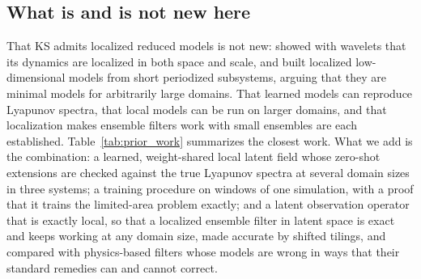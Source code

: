 \subsection{What is and is not new here}
\label{sec:bg_novelty}

That KS admits localized reduced models is not new:
\citet{wittenberg1999} showed with wavelets that its dynamics are
localized in both space and scale, and \citet{wittenberg2001} built
localized low-dimensional models from short periodized subsystems,
arguing that they are minimal models for arbitrarily large domains. That
learned models can reproduce Lyapunov spectra, that local models can be
run on larger domains, and that localization makes ensemble filters work
with small ensembles are each established. Table~\ref{tab:prior_work}
summarizes the closest work. What we add is the combination: a learned,
weight-shared local latent field whose zero-shot extensions are checked
against the true Lyapunov spectra at several domain sizes in three
systems; a training procedure on windows of one simulation, with a proof
that it trains the limited-area problem exactly; and a latent observation
operator that is exactly local, so that a localized ensemble filter in
latent space is exact and keeps working at any domain size, made accurate
by shifted tilings, and compared with physics-based filters whose models
are wrong in ways that their standard remedies can and cannot correct.

